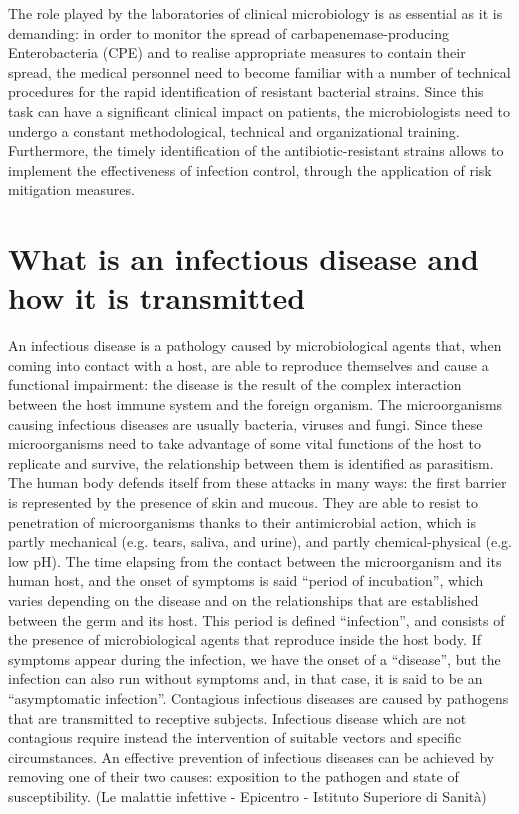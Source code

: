 \documentclass[11pt]{report}
\begin{document}
The role played by the laboratories of clinical microbiology is as essential as it is demanding: in order to monitor the spread of carbapenemase-producing Enterobacteria (CPE) and to realise appropriate measures to contain their spread, the medical personnel need to become familiar with a number of technical procedures for the rapid identification of resistant bacterial strains.
Since this task can have a significant clinical impact on patients, the microbiologists need to undergo a constant methodological, technical and organizational training.
Furthermore, the timely identification of the antibiotic-resistant strains allows to implement the effectiveness of infection control, through the application of risk mitigation measures.

\section{What is an infectious disease and how it is transmitted}

An infectious disease is a pathology caused by microbiological agents that, when coming into contact with a host, are able to reproduce themselves and cause a functional impairment: the disease is the result of the complex interaction between the host immune system and the foreign organism.
The microorganisms causing infectious diseases are usually bacteria, viruses and fungi.
Since these microorganisms need to take advantage of some vital functions of the host to replicate and survive, the relationship between them is identified as parasitism.
The human body defends itself from these attacks in many ways: the first barrier is represented by the presence of skin and mucous.
They are able to resist to penetration of microorganisms thanks to their antimicrobial action, which is partly mechanical (e.g. tears, saliva, and urine), and partly chemical-physical (e.g. low pH).
The time elapsing from the contact between the microorganism and its human host, and the onset of symptoms is said “period of incubation”, which varies depending on the disease and on the relationships that are established between the germ and its host.
This period is defined “infection”, and consists of the presence of microbiological agents that reproduce inside the host body.
If symptoms appear during the infection, we have the onset of a “disease”, but the infection can also run without symptoms and, in that case, it is said to be an “asymptomatic infection”.
Contagious infectious diseases are caused by pathogens that are transmitted to receptive subjects.
Infectious disease which are not contagious require instead the intervention of suitable vectors and specific circumstances.
An effective prevention of infectious diseases can be achieved by removing one of their two causes: exposition to the pathogen and state of susceptibility.
(Le malattie infettive - Epicentro - Istituto Superiore di Sanità)
\end{document}
